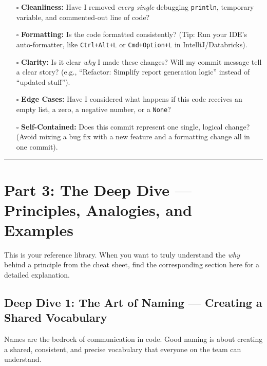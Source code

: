 \documentclass[
  letterpaper,
  DIV=11,
  numbers=noendperiod]{scrreprt}
\providecommand{\tightlist}{%
  \setlength{\itemsep}{0pt}\setlength{\parskip}{0pt}}
\begin{document}
\begin{itemize}
\tightlist
\item[$\square$]
  \textbf{Cleanliness:} Have I removed \emph{every single} debugging
  \texttt{println}, temporary variable, and commented-out line of code?
\item[$\square$]
  \textbf{Formatting:} Is the code formatted consistently? (Tip: Run
  your IDE's auto-formatter, like \texttt{Ctrl+Alt+L} or
  \texttt{Cmd+Option+L} in IntelliJ/Databricks).
\item[$\square$]
  \textbf{Clarity:} Is it clear \emph{why} I made these changes? Will my
  commit message tell a clear story? (e.g., ``Refactor: Simplify report
  generation logic'' instead of ``updated stuff'').
\item[$\square$]
  \textbf{Edge Cases:} Have I considered what happens if this code
  receives an empty list, a zero, a negative number, or a \texttt{None}?
\item[$\square$]
  \textbf{Self-Contained:} Does this commit represent one single,
  logical change? (Avoid mixing a bug fix with a new feature and a
  formatting change all in one commit).
\end{itemize}

\begin{center}\rule{0.5\linewidth}{0.5pt}\end{center}

\section{\texorpdfstring{\textbf{Part 3: The Deep Dive --- Principles,
Analogies, and
Examples}}{Part 3: The Deep Dive --- Principles, Analogies, and Examples}}\label{part-3-the-deep-dive-principles-analogies-and-examples}

This is your reference library. When you want to truly understand the
\emph{why} behind a principle from the cheat sheet, find the
corresponding section here for a detailed explanation.

\subsection{\texorpdfstring{\textbf{Deep Dive 1: The Art of Naming ---
Creating a Shared
Vocabulary}}{Deep Dive 1: The Art of Naming --- Creating a Shared Vocabulary}}\label{deep-dive-1-the-art-of-naming-creating-a-shared-vocabulary}

Names are the bedrock of communication in code. Good naming is about
creating a shared, consistent, and precise vocabulary that everyone on
the team can understand.
\end{document}
